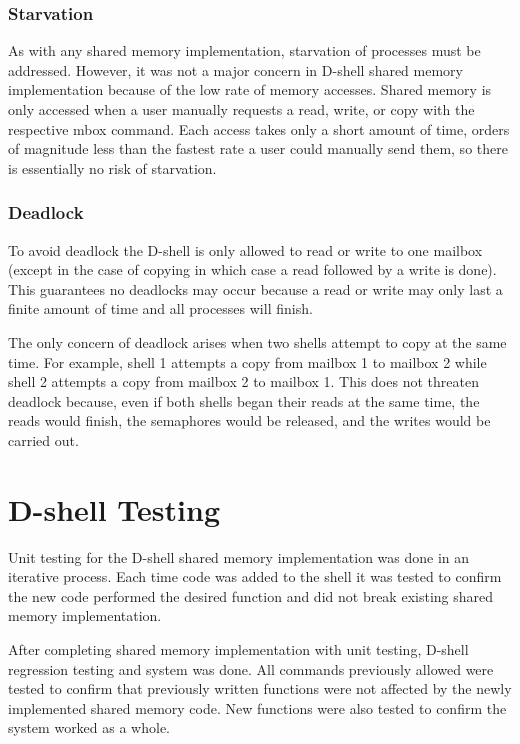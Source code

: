 \begin{multicols}{2}
\subsubsection{Starvation}
As with any shared memory implementation, starvation of processes must be addressed. However, it was not a major concern in D-shell shared memory implementation because of the low rate of memory accesses. Shared memory is only accessed when a user manually requests a read, write, or copy with the respective mbox command. Each access takes only a short amount of time, orders of magnitude less than the fastest rate a user could manually send them, so there is essentially no risk of starvation.

\subsubsection{Deadlock}
To avoid deadlock the D-shell is only allowed to read or write to one mailbox (except in the case of copying in which case a read followed by a write is done). This guarantees no deadlocks may occur because a read or write may only last a finite amount of time and all processes will finish.

The only concern of deadlock arises when two shells attempt to copy at the same time. For example, shell 1 attempts a copy from mailbox 1 to mailbox 2 while shell 2 attempts a copy from mailbox 2 to mailbox 1. This does not threaten deadlock because, even if both shells began their reads at the same time, the reads would finish, the semaphores would be released, and the writes would be carried out.


\section{D-shell Testing}\label{testing}
Unit testing for the D-shell shared memory implementation was done in an iterative process. Each time code was added to the shell it was tested to confirm the new code performed the desired function and did not break existing shared memory implementation. 

After completing shared memory implementation with unit testing, D-shell regression testing and system was done. All commands previously allowed were tested to confirm that previously written functions were not affected by the newly implemented shared memory code. New functions were also tested to confirm the system worked as a whole. 


\end{multicols}
